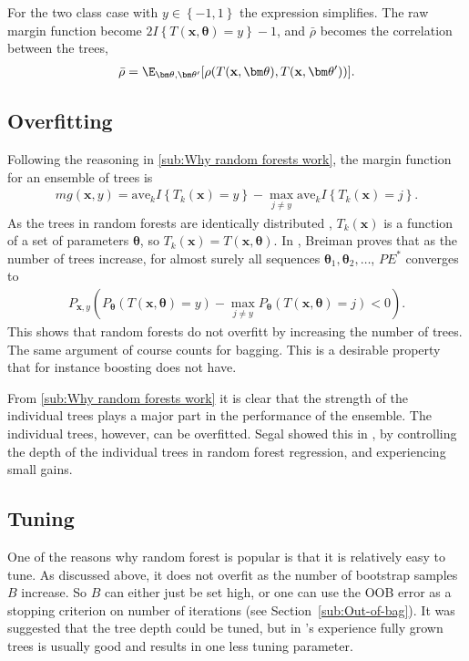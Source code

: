 For the two class case with $y \in \left\{ -1, 1 \right\}$ the expression simplifies. The raw margin function become $2 I\left\{ T(\mathbf{x}, \bm \theta) = y \right\} - 1$, and $\bar \rho$ becomes the correlation between the trees,
\begin{align}
  \bar \rho = \E_{\bm \theta, \bm \theta'}[\rho(T(\mathbf{x}, \bm \theta), T(\mathbf{x}, \bm \theta'))]. 
\end{align}



\subsection{Overfitting}
\label{sub:Overfitting}
Following the reasoning in \ref{sub:Why random forests work}, the margin function for an ensemble of trees is
\begin{align}
  mg(\mathbf{x}, y) = \mathrm{ave}_k I\left\{ T_k(\mathbf{x}) = y \right\} - 
  \max_{j \neq y} \mathrm{ave}_k I\left\{ T_k(\mathbf{x}) = j \right\}.
\end{align}
As the trees in random forests are identically distributed , $T_k(\mathbf{x})$ is a function of a set of parameters $\bm \theta$, so $T_k(\mathbf{x}) = T(\mathbf{x}, \bm \theta)$. In \cite{randomforests}, Breiman proves that as the number of trees increase, for almost surely all sequences $\bm \theta_1, \bm \theta_2, \ldots$, $PE^*$ converges to 
\begin{align}
  P_{\mathbf{x}, y} (P_{\bm \theta} (T(\mathbf{x}, \bm \theta) = y) - \max_{j \neq y} P_{\bm \theta}(T(\mathbf{x}, \bm \theta) = j) < 0).
\end{align}
This shows that random forests do not overfitt by increasing the number of trees. The same argument of course counts for bagging. This is a desirable property that for instance boosting does not have. 

From \ref{sub:Why random forests work} it is clear that the strength of the individual trees plays a major part in the performance of the ensemble. The individual trees, however, can be overfitted. Segal showed this in \cite{segal2004},  by controlling the depth of the individual trees in random forest regression, and experiencing small gains. 


\subsection{Tuning}
\label{sub:Tuning}
One of the reasons why random forest is popular is that it is relatively easy to tune. As discussed above, it does not overfit as the number of bootstrap samples $B$ increase. So $B$ can either just be set high, or one can use the OOB error as a stopping criterion on number of iterations (see Section~\ref{sub:Out-of-bag}). It was suggested that the tree depth could be tuned, but in \cite{modstat}'s experience fully grown trees is usually good and results in one less tuning parameter. 


